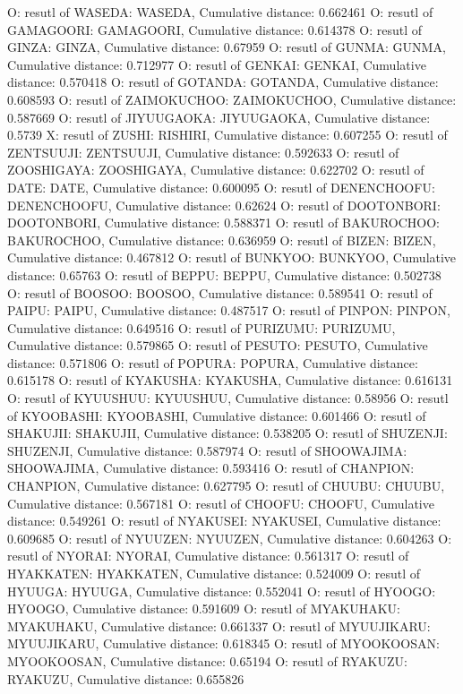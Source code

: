 O: resutl of WASEDA: WASEDA, Cumulative distance: 0.662461
O: resutl of GAMAGOORI: GAMAGOORI, Cumulative distance: 0.614378
O: resutl of GINZA: GINZA, Cumulative distance: 0.67959
O: resutl of GUNMA: GUNMA, Cumulative distance: 0.712977
O: resutl of GENKAI: GENKAI, Cumulative distance: 0.570418
O: resutl of GOTANDA: GOTANDA, Cumulative distance: 0.608593
O: resutl of ZAIMOKUCHOO: ZAIMOKUCHOO, Cumulative distance: 0.587669
O: resutl of JIYUUGAOKA: JIYUUGAOKA, Cumulative distance: 0.5739
X: resutl of ZUSHI: RISHIRI, Cumulative distance: 0.607255
O: resutl of ZENTSUUJI: ZENTSUUJI, Cumulative distance: 0.592633
O: resutl of ZOOSHIGAYA: ZOOSHIGAYA, Cumulative distance: 0.622702
O: resutl of DATE: DATE, Cumulative distance: 0.600095
O: resutl of DENENCHOOFU: DENENCHOOFU, Cumulative distance: 0.62624
O: resutl of DOOTONBORI: DOOTONBORI, Cumulative distance: 0.588371
O: resutl of BAKUROCHOO: BAKUROCHOO, Cumulative distance: 0.636959
O: resutl of BIZEN: BIZEN, Cumulative distance: 0.467812
O: resutl of BUNKYOO: BUNKYOO, Cumulative distance: 0.65763
O: resutl of BEPPU: BEPPU, Cumulative distance: 0.502738
O: resutl of BOOSOO: BOOSOO, Cumulative distance: 0.589541
O: resutl of PAIPU: PAIPU, Cumulative distance: 0.487517
O: resutl of PINPON: PINPON, Cumulative distance: 0.649516
O: resutl of PURIZUMU: PURIZUMU, Cumulative distance: 0.579865
O: resutl of PESUTO: PESUTO, Cumulative distance: 0.571806
O: resutl of POPURA: POPURA, Cumulative distance: 0.615178
O: resutl of KYAKUSHA: KYAKUSHA, Cumulative distance: 0.616131
O: resutl of KYUUSHUU: KYUUSHUU, Cumulative distance: 0.58956
O: resutl of KYOOBASHI: KYOOBASHI, Cumulative distance: 0.601466
O: resutl of SHAKUJII: SHAKUJII, Cumulative distance: 0.538205
O: resutl of SHUZENJI: SHUZENJI, Cumulative distance: 0.587974
O: resutl of SHOOWAJIMA: SHOOWAJIMA, Cumulative distance: 0.593416
O: resutl of CHANPION: CHANPION, Cumulative distance: 0.627795
O: resutl of CHUUBU: CHUUBU, Cumulative distance: 0.567181
O: resutl of CHOOFU: CHOOFU, Cumulative distance: 0.549261
O: resutl of NYAKUSEI: NYAKUSEI, Cumulative distance: 0.609685
O: resutl of NYUUZEN: NYUUZEN, Cumulative distance: 0.604263
O: resutl of NYORAI: NYORAI, Cumulative distance: 0.561317
O: resutl of HYAKKATEN: HYAKKATEN, Cumulative distance: 0.524009
O: resutl of HYUUGA: HYUUGA, Cumulative distance: 0.552041
O: resutl of HYOOGO: HYOOGO, Cumulative distance: 0.591609
O: resutl of MYAKUHAKU: MYAKUHAKU, Cumulative distance: 0.661337
O: resutl of MYUUJIKARU: MYUUJIKARU, Cumulative distance: 0.618345
O: resutl of MYOOKOOSAN: MYOOKOOSAN, Cumulative distance: 0.65194
O: resutl of RYAKUZU: RYAKUZU, Cumulative distance: 0.655826

